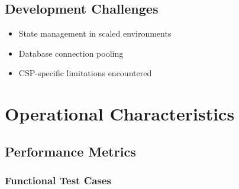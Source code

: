 \documentclass{llncs}
\begin{document}
\subsection{Development Challenges}
\begin{itemize}
    \item State management in scaled environments
    \item Database connection pooling
    \item CSP-specific limitations encountered
\end{itemize}

\section{Operational Characteristics}
\subsection{Performance Metrics}

\subsubsection{Functional Test Cases}

\renewcommand{\arraystretch}{1.3} %
\end{document}
